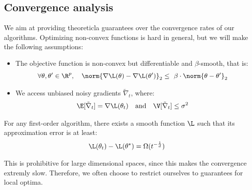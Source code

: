 \subsection{Convergence analysis}
We aim at providing theoreticla guarantees over the convergence rates of our algorithms. Optimizing non-convex functions is hard in general, but we will make the following assumptions:
\begin{itemize}
    \item The objective function is non-convex but differentiable and $\beta$-smooth, that is:
    \begin{equation*}
        \forall\theta,\theta'\in\R^p, \quad \norm{\nabla\L(\theta)-\nabla\L(\theta')}_2 \leq \beta\cdot\norm{\theta-\theta'}_2
    \end{equation*}
    \item We access unbiased noisy gradients $\tilde{\nabla}_t$, where:
    \begin{equation*}
        \E[\tilde{\nabla}_t] = \nabla\L(\theta_t) \quad \textnormal{and} \quad \V[\tilde{\nabla}_t] \leq\sigma^2
    \end{equation*}
\end{itemize}

\begin{property}
    For any first-order algorithm, there exists a smooth function $\L$ such that its approximation error is at least:
    \begin{equation*}
        \L(\theta_t)-\L(\theta^*) = \Omega(t^{-\frac{1}{d}})
    \end{equation*}
\end{property}
This is prohibitive for large dimensional spaces, since this makes the convergence extremly slow. Therefore, we often choose to restrict ourselves to guarantees for local optima.

